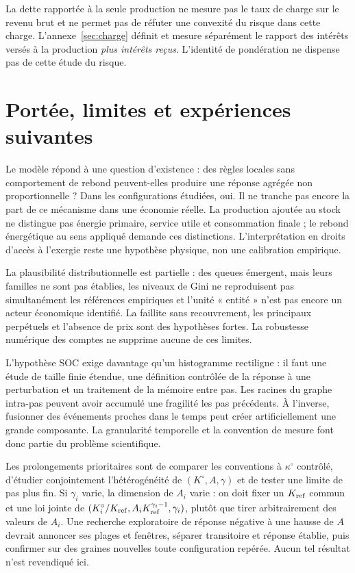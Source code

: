 La dette rapportée à la seule production ne mesure pas le taux de charge
sur le revenu brut et ne permet pas de réfuter une convexité du risque
dans cette charge. L'annexe~\ref{sec:charge} définit et mesure séparément
le rapport des intérêts versés à la production \emph{plus intérêts reçus}.
L'identité de pondération ne dispense pas de cette étude du risque.

\section{Portée, limites et expériences suivantes}\label{sec:perspectives}
Le modèle répond à une question d'existence : des règles locales sans
comportement de rebond peuvent-elles produire une réponse agrégée non
proportionnelle ? Dans les configurations étudiées, oui. Il ne tranche
pas encore la part de ce mécanisme dans une économie réelle.
La production ajoutée au stock ne distingue pas énergie primaire,
service utile et consommation finale ; le rebond énergétique au sens
appliqué \cite{sorrell} demande ces distinctions. L'interprétation en
droits d'accès à l'exergie reste une hypothèse physique, non une
calibration empirique.

La plausibilité distributionnelle est partielle : des queues émergent,
mais leurs familles ne sont pas établies, les niveaux de Gini ne reproduisent
pas simultanément les références empiriques et l'unité « entité » n'est
pas encore un acteur économique identifié. La faillite sans recouvrement,
les principaux perpétuels et l'absence de prix sont des hypothèses fortes.
La robustesse numérique des comptes ne supprime aucune de ces limites.

L'hypothèse SOC exige davantage qu'un histogramme rectiligne : il faut
une étude de taille finie étendue, une définition contrôlée de la réponse
à une perturbation et un traitement de la mémoire entre pas. Les racines
du graphe intra-pas peuvent avoir accumulé une fragilité les pas précédents.
À l'inverse, fusionner des événements proches dans le temps peut créer
artificiellement une grande composante. La granularité temporelle et
la convention de mesure font donc partie du problème scientifique.

Les prolongements prioritaires sont de comparer les conventions à
$\kappa^\circ$ contrôlé, d'étudier conjointement l'hétérogénéité de
$(K^\circ,A,\gamma)$ et de tester une limite de pas plus fin. Si
$\gamma_i$ varie, la dimension de $A_i$ varie : on doit fixer un
$K_{\rm ref}$ commun et une loi jointe de
$(K_i^\circ/K_{\rm ref},A_iK_{\rm ref}^{\gamma_i-1},\gamma_i)$,
plutôt que tirer arbitrairement des valeurs de $A_i$.
Une recherche exploratoire de réponse négative à une hausse de $A$
devrait annoncer ses plages et fenêtres, séparer transitoire et réponse
établie, puis confirmer sur des graines nouvelles toute configuration
repérée. Aucun tel résultat n'est revendiqué ici.

